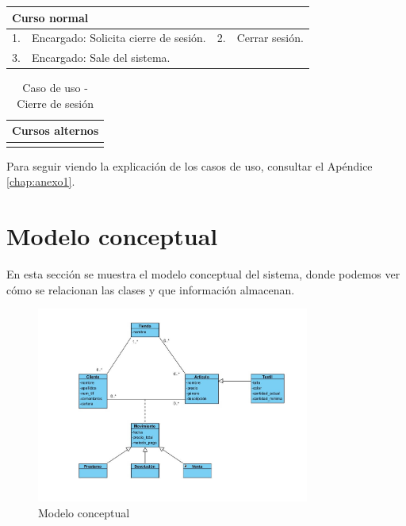 \begin{table}[H]
	\centering
	\begin{tabular}{| m{} | m{} | m{} | m{} |}
		\hline
		\multicolumn{4}{|m{0.9\textwidth}|}{Curso normal}     \\ 
		\hline
		1. & Encargado: Solicita cierre de sesión. & 2. & Cerrar sesión. \\ 
		\hline
		3. & Encargado: Sale del sistema. &  &  \\ 
		\hline
	\end{tabular}
\end{table}

\begin{table}[H]
	\centering
	\begin{tabular}{| m{} | m{} | m{} | m{} |}
		\hline
		\multicolumn{4}{|m{0.9\textwidth}|}{Cursos alternos}     \\ 
		\hline
		 & \multicolumn{3}{m{0.67\textwidth}|}{} \\ 
		\hline
	\end{tabular}
	\caption{Caso de uso - Cierre de sesión}
\end{table}

Para seguir viendo la explicación de los casos de uso, consultar el Apéndice \ref{chap:anexo1}.


\newpage

\section{Modelo conceptual}

En esta sección se muestra el modelo conceptual del sistema, donde podemos ver cómo se relacionan las clases y que información almacenan. 

\begin{figure}[H]
	\centering
	\includegraphics[width=0.8\textwidth]{imagenes/imagenesDiagramas/modelo_conceptual.jpg}
	\caption{Modelo conceptual}
	\label{fig:modelo_conceptual}
\end{figure}


